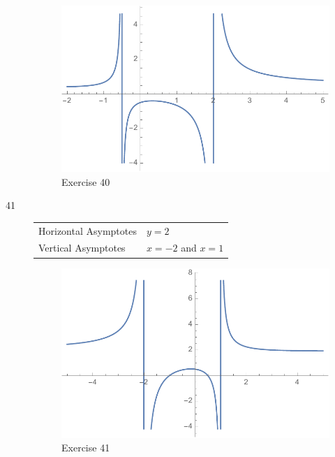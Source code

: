 \documentclass[letterpaper, landscape]{exam}
\begin{document}
\begin{description}
        \begin{figure}[H]
          \centering
          \includegraphics[scale = 0.5]{ex40.pdf}
          \caption{Exercise 40}
          \label{fig:ex40}
        \end{figure}

      \newpage

      \item[41]
        \begin{tabular}[H]{ll}
          \toprule
          Horizontal Asymptotes & $y = 2$ \\
          Vertical Asymptotes   & $x = -2$ and $x = 1$ \\
          \bottomrule
        \end{tabular}

        \begin{figure}[H]
          \centering
          \includegraphics[scale = 0.5]{ex41.pdf}
          \caption{Exercise 41}
          \label{fig:ex41}
        \end{figure}


\end{description}
\end{document}
